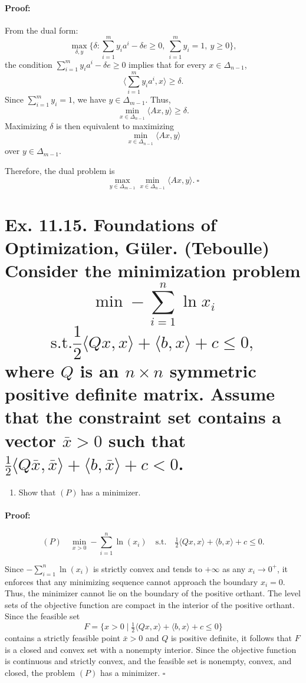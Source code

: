 \documentclass[10pt]{article}
\begin{document}
\paragraph{Proof:}


From the dual form:
\[
\max_{\delta, y} \{\delta : \sum_{i=1}^m y_i a^i - \delta e \geq 0, \ \sum_{i=1}^m y_i = 1, \ y \geq 0 \},
\]
the condition $\sum_{i=1}^m y_i a^i - \delta e \geq 0$ implies that for every $x \in \Delta_{n-1}$,
\[
\langle \sum_{i=1}^m y_i a^i, x \rangle \geq \delta.
\]
Since $\sum_{i=1}^m y_i = 1$, we have $y \in \Delta_{m-1}$. Thus,
\[
\min_{x \in \Delta_{n-1}} \langle A x, y \rangle \geq \delta.
\]
Maximizing $\delta$ is then equivalent to maximizing 
\[
\min_{x \in \Delta_{n-1}} \langle A x, y \rangle
\]
over $y \in \Delta_{m-1}$.

Therefore, the dual problem is
\[
\max_{y \in \Delta_{m-1}} \min_{x \in \Delta_{n-1}} \langle A x, y \rangle.\ \square
\]




\hfill \break %

\section{Ex. 11.15. Foundations of Optimization, Güler. (Teboulle)
Consider the minimization problem $$\min -\sum_{i=1}^{n} \ln x_i$$
$$\text{s.t.} \frac{1}{2} \langle Qx, x \rangle + \langle b, x \rangle + c \leq 0,$$
where $Q$ is an $n \times n$ symmetric positive definite matrix. Assume that the constraint set contains a vector $\bar{x}>0$ such
that $\frac{1}{2} \langle Q\bar{x}, \bar{x} \rangle + \langle b, \bar{x} \rangle + c<0$. 
}

\begin{enumerate}[label=(\alph*)] 
  \item Show that $(P)$ has a minimizer.
\end{enumerate}

\paragraph{Proof:}

\[
(P) \quad \min_{x>0} -\sum_{i=1}^{n} \ln(x_i) \quad \text{s.t.} \quad \tfrac{1}{2}\langle Qx,x \rangle + \langle b,x\rangle + c \leq 0.
\]

Since $-\sum_{i=1}^{n}\ln(x_i)$ is strictly convex and tends to $+\infty$ as any $x_i \to 0^{+}$, it enforces that any minimizing sequence cannot approach the boundary $x_i=0$. Thus, the minimizer cannot lie on the boundary of the positive orthant. The level sets of the objective function are compact in the interior of the positive orthant. Since the feasible set 
\[
F = \{x > 0 \mid \tfrac{1}{2}\langle Qx,x\rangle + \langle b,x\rangle + c \leq 0\}
\]
contains a strictly feasible point $\bar{x} > 0$ and $Q$ is positive definite, it follows that $F$ is a closed and convex set with a nonempty interior. Since the objective function is continuous and strictly convex, and the feasible set is nonempty, convex, and closed, the problem $(P)$ has a minimizer. $\square$
\end{document}
